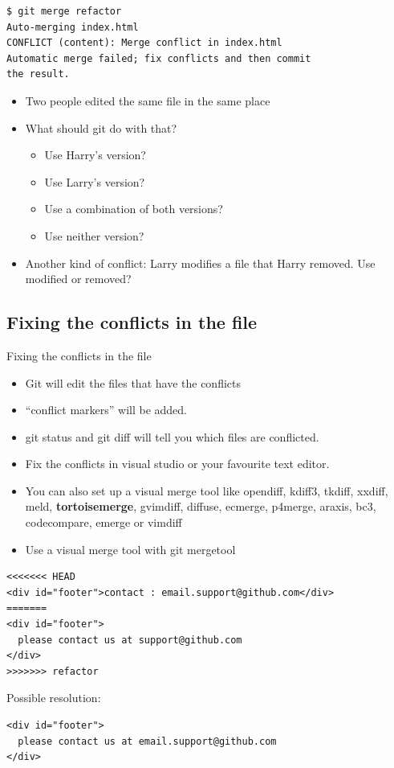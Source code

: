 \documentclass[10pt,a4paper]{beamer}
\begin{document}
\begin{frame}[fragile]
\begin{verbatim}
$ git merge refactor
Auto-merging index.html
CONFLICT (content): Merge conflict in index.html
Automatic merge failed; fix conflicts and then commit
the result.
\end{verbatim}
\begin{itemize}
	\item Two people edited the same file in the same place
	\item What should git do with that?
	\begin{itemize}
	\item Use Harry's version?
	\item Use Larry's version?
	\item Use a combination of both versions?
	\item Use neither version?
	\end{itemize}

	\item Another kind of conflict: Larry modifies a file that Harry removed. Use modified or removed?
\end{itemize}
\end{frame}

\subsection{Fixing the conflicts in the file}
\begin{frame}[fragile]{Fixing the conflicts in the file}
\begin{itemize}
\item Git will edit the files that have the conflicts
\item ``conflict markers'' will be added.
\item git status and git diff will tell you which files are conflicted.
\item Fix the conflicts in visual studio or your favourite text editor.
\item You can also set up a visual merge tool like opendiff, kdiff3, tkdiff, xxdiff, meld, \textbf{tortoisemerge}, gvimdiff, diffuse, ecmerge, p4merge, araxis, bc3, codecompare, emerge or vimdiff
\item Use a visual merge tool with git mergetool
\end{itemize}
\end{frame}

\begin{frame}[fragile]
\begin{verbatim}
<<<<<<< HEAD
<div id="footer">contact : email.support@github.com</div>
=======
<div id="footer">
  please contact us at support@github.com
</div>
>>>>>>> refactor
\end{verbatim}

Possible resolution:
\begin{verbatim}
<div id="footer">
  please contact us at email.support@github.com
</div>
\end{verbatim}
\end{frame}
\end{document}
